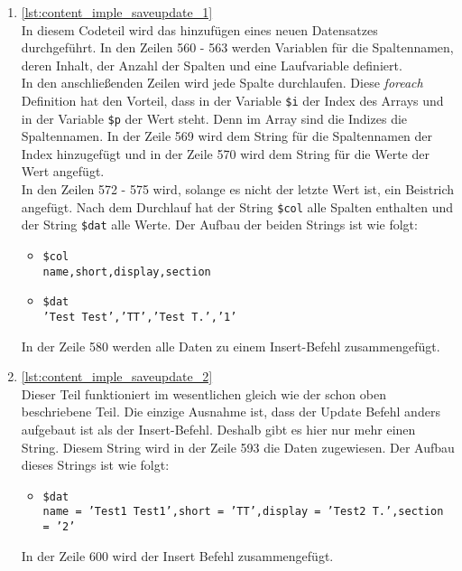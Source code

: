 \begin{enumerate}

	\item \autoref{lst:content_imple_saveupdate_1}\\
	In diesem Codeteil wird das hinzufügen eines neuen Datensatzes durchgeführt. In den Zeilen 560 - 563 werden Variablen für die Spaltennamen, deren Inhalt, der Anzahl der Spalten und eine Laufvariable definiert.\\
	In den anschließenden Zeilen wird jede Spalte durchlaufen. Diese \textit{foreach} Definition hat den Vorteil, dass in der Variable \texttt{\$i} der Index des Arrays und in der Variable \texttt{\$p} der Wert steht. Denn im Array sind die Indizes die Spaltennamen. In der Zeile 569 wird dem String für die Spaltennamen der Index hinzugefügt und in der Zeile 570 wird dem String für die Werte der Wert angefügt.\\
	In den Zeilen 572 - 575 wird, solange es nicht der letzte Wert ist, ein Beistrich angefügt. Nach dem Durchlauf hat der String \texttt{\$col} alle Spalten enthalten und der String \texttt{\$dat} alle Werte. Der Aufbau der beiden Strings ist wie folgt:
	
	\begin{itemize}
		\item \texttt{\$col}\\
		\texttt{name,short,display,section}
		\item  \texttt{\$dat}\\
		\texttt{'Test Test','TT','Test T.','1'}
	\end{itemize}
	
	In der Zeile 580 werden alle Daten zu einem Insert-Befehl zusammengefügt.
	
	

	\item \autoref{lst:content_imple_saveupdate_2}\\
	Dieser Teil funktioniert im wesentlichen gleich wie der schon oben beschriebene Teil. Die einzige Ausnahme ist, dass der Update Befehl anders aufgebaut ist als der Insert-Befehl. Deshalb gibt es hier nur mehr einen String. Diesem String wird in der Zeile 593 die Daten zugewiesen. Der Aufbau dieses Strings ist wie folgt:
	
	\begin{itemize}
		\item  \texttt{\$dat}\\
		\texttt{name = 'Test1 Test1',short = 'TT',display = 'Test2 T.',section = '2'}
	\end{itemize}
	
	In der Zeile 600 wird der Insert Befehl zusammengefügt.
	
	

\end{enumerate}

